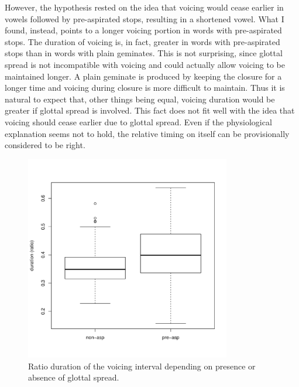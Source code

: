 \documentclass[11pt,a4paper,openany]{memoir}\usepackage[]{graphicx}\usepackage[]{color}
\newenvironment{knitrout}{}{} %
\begin{document}
However, the hypothesis rested on the idea that voicing would cease earlier in vowels followed by pre-aspirated stops, resulting in a shortened vowel.
What I found, instead, points to a longer voicing portion in words with pre-aspirated stops.
The duration of voicing is, in fact, greater in words with pre-aspirated stops than in words with plain geminates.
This is not surprising, since glottal spread is not incompatible with voicing and could actually allow voicing to be maintained longer.
A plain geminate is produced by keeping the closure for a longer time and voicing during closure is more difficult to maintain.
Thus it is natural to expect that, other things being equal, voicing duration would be greater if glottal spread is involved.
This fact does not fit well with the idea that voicing should cease earlier due to glottal spread.
Even if the physiological explanation seems not to hold, the relative timing on itself can be provisionally considered to be right.

\begin{figure}
\centering
\begin{knitrout}
\color{fgcolor}
\includegraphics[width=0.8\textwidth]{img/voic-stop-1} 

\end{knitrout}
\caption{Ratio duration of the voicing interval depending on presence or absence of glottal spread.}
\label{f:voicdur}
\end{figure}
\end{document}
